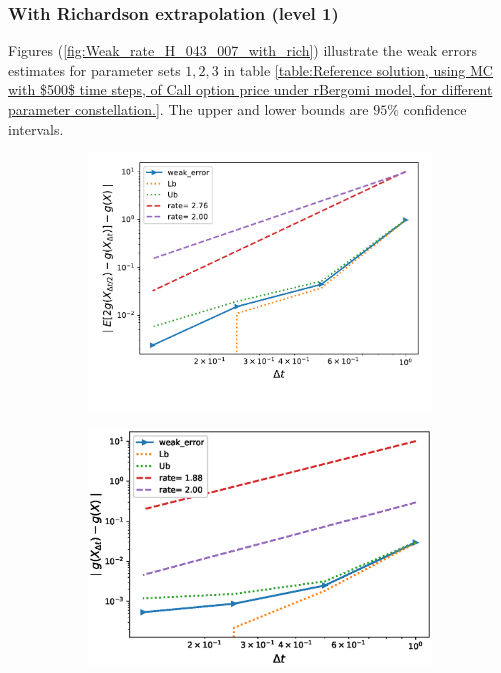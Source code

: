 \subsubsection{With Richardson extrapolation (level 1)}
Figures (\ref{fig:Weak_rate_H_043_007_with_rich}) illustrate the weak errors estimates for parameter sets $1,2,3$ in table \ref{table:Reference solution, using MC with $500$ time steps, of Call option price under rBergomi model, for different parameter constellation.}. The upper and lower bounds are $95\%$ confidence intervals.
\FloatBarrier
\begin{figure}[h!]
	\centering
	\begin{subfigure}{.35\textwidth}
		\centering
		\includegraphics[width=1\linewidth]{./figures/rBergomi_weak_error_rates/with_richardson/H_007/weak_convergence_order_Bergomi_H_007_K_1_richardson_relative_M_10_6}
		\caption{}
		\label{fig:sub3}
	\end{subfigure}%
	\begin{subfigure}{.35\textwidth}
		\centering
		\includegraphics[width=1\linewidth]{./figures/rBergomi_weak_error_rates/with_richardson/H_002/weak_convergence_order_Bergomi_H_002_K_1_M_1_10_7_richardson_relative}
		\caption{}
		\label{fig:sub4}
	\end{subfigure}
	

\end{figure}
